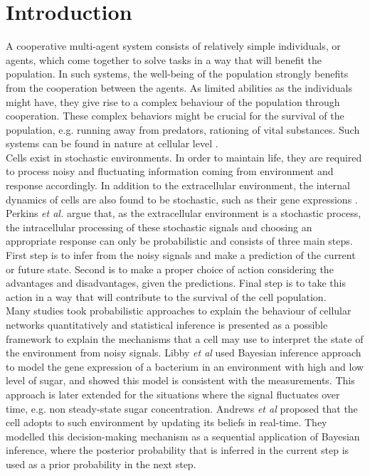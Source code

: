 \chapter{Introduction}
A cooperative multi-agent system consists of relatively simple individuals, or agents, which come together to solve tasks in a way that will benefit the population. In such systems, the well-being of the population strongly benefits from the cooperation between the agents. As limited abilities as the individuals might have, they give rise to a complex behaviour of the population through cooperation. These complex behaviors might be crucial for the survival of the population, e.g. running away from predators, rationing of vital substances. Such systems can be found in nature at cellular level \cite{Perkins2009a}. \\
Cells exist in stochastic environments. In order to maintain life, they are required to process noisy and fluctuating information coming from environment and response accordingly. In addition to the extracellular environment, the internal dynamics of cells are also found to be stochastic, such as their gene expressions \cite{Shahrezaei2008}. \\
Perkins \textit{et al.} \cite{Perkins2009a} argue that, as the extracellular environment is a stochastic process, the intracellular processing of these stochastic signals and choosing an appropriate response can only be probabilistic and consists of three main steps. First step is to infer from the noisy signals and make a prediction of the current or future state. Second is to make a proper choice of action considering the advantages and disadvantages, given the predictions. Final step is to take this action in a way that will contribute to the survival of the cell population. \\
Many studies took probabilistic approaches to explain the behaviour of cellular networks quantitatively and statistical inference is presented as a possible framework to explain the mechanisms that a cell may use to interpret the state of the environment from noisy signals. Libby \textit{et al} \cite{Libby2007} used Bayesian inference approach to model the gene expression of a bacterium in an environment with high and low level of sugar, and showed this model is consistent with the measurements. This approach is later extended for the situations where the signal fluctuates over time, e.g. non steady-state sugar concentration. Andrews \textit{et al} \cite{Andrews2006} proposed that the cell adopts to such environment by updating its beliefs in real-time. They modelled this decision-making mechanism as a sequential application of Bayesian inference, where the posterior probability that is inferred in the current step is used as a prior probability in the next step.\\
